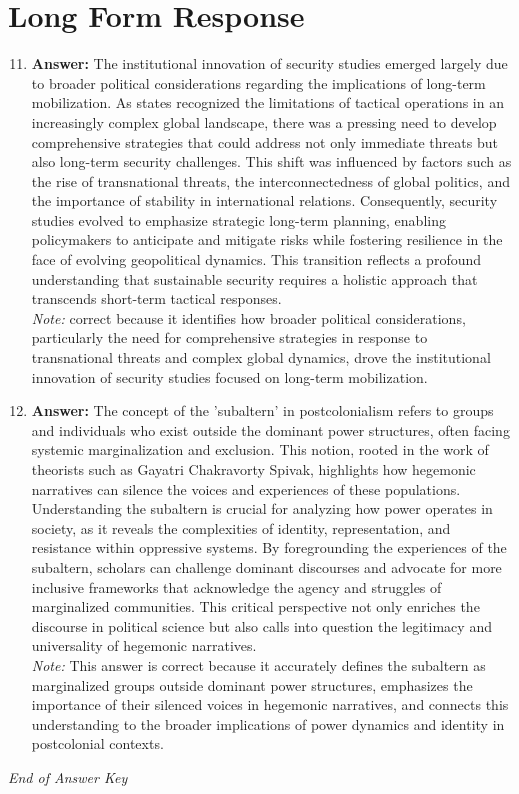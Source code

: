 \documentclass[12pt]{article}
\begin{document}
\section*{Long Form Response}
\begin{enumerate}[label=\arabic*.]
\setcounter{enumi}{10}
\item \textbf{Answer:} The institutional innovation of security studies emerged largely due to broader political considerations regarding the implications of long-term mobilization. As states recognized the limitations of tactical operations in an increasingly complex global landscape, there was a pressing need to develop comprehensive strategies that could address not only immediate threats but also long-term security challenges. This shift was influenced by factors such as the rise of transnational threats, the interconnectedness of global politics, and the importance of stability in international relations. Consequently, security studies evolved to emphasize strategic long-term planning, enabling policymakers to anticipate and mitigate risks while fostering resilience in the face of evolving geopolitical dynamics. This transition reflects a profound understanding that sustainable security requires a holistic approach that transcends short-term tactical responses.
\\ \textit{Note:} correct because it identifies how broader political considerations, particularly the need for comprehensive strategies in response to transnational threats and complex global dynamics, drove the institutional innovation of security studies focused on long-term mobilization.
\item \textbf{Answer:} The concept of the 'subaltern' in postcolonialism refers to groups and individuals who exist outside the dominant power structures, often facing systemic marginalization and exclusion. This notion, rooted in the work of theorists such as Gayatri Chakravorty Spivak, highlights how hegemonic narratives can silence the voices and experiences of these populations. Understanding the subaltern is crucial for analyzing how power operates in society, as it reveals the complexities of identity, representation, and resistance within oppressive systems. By foregrounding the experiences of the subaltern, scholars can challenge dominant discourses and advocate for more inclusive frameworks that acknowledge the agency and struggles of marginalized communities. This critical perspective not only enriches the discourse in political science but also calls into question the legitimacy and universality of hegemonic narratives.
\\ \textit{Note:} This answer is correct because it accurately defines the subaltern as marginalized groups outside dominant power structures, emphasizes the importance of their silenced voices in hegemonic narratives, and connects this understanding to the broader implications of power dynamics and identity in postcolonial contexts.
\end{enumerate}

\vfill
\noindent\textit{End of Answer Key}
\end{document}
